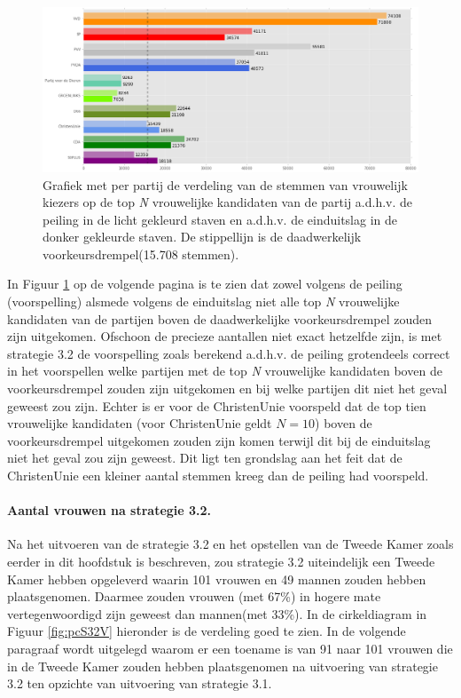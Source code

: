 \begin{figure}[h]

	\includegraphics[width=\linewidth]{stemmen_op_vrouwen_eigenX_samen.png}

			\caption{Grafiek met per partij de verdeling van de stemmen van vrouwelijk kiezers op de top \textit{N} vrouwelijke kandidaten van de partij a.d.h.v. de peiling \citep{IPSOS} in de licht gekleurd staven en a.d.h.v. de einduitslag \citep{Kiesraad_databank} in de donker gekleurde staven. De stippellijn is de daadwerkelijk voorkeursdrempel(15.708 stemmen).}

\label{fig:stemmenS32V}
\end{figure}


In Figuur \ref{fig:stemmenS32V} op de volgende pagina is te zien dat zowel volgens de peiling (voorspelling) alsmede volgens de einduitslag niet alle top \textit{N} vrouwelijke kandidaten van de partijen boven de daadwerkelijke voorkeursdrempel zouden zijn uitgekomen. Ofschoon de precieze aantallen niet exact hetzelfde zijn, is met strategie 3.2 de voorspelling zoals berekend a.d.h.v. de peiling grotendeels correct in het voorspellen welke partijen met de top \textit{N} vrouwelijke kandidaten boven de voorkeursdrempel zouden zijn uitgekomen en bij welke partijen dit niet het geval geweest zou zijn. Echter is er voor de ChristenUnie voorspeld dat de top tien vrouwelijke kandidaten (voor ChristenUnie geldt $N=10$) boven de voorkeursdrempel uitgekomen zouden zijn komen terwijl dit bij de einduitslag niet het geval zou zijn geweest. Dit ligt ten grondslag aan het feit dat de ChristenUnie een kleiner aantal stemmen kreeg dan de peiling had voorspeld. 

\paragraph{Aantal vrouwen na strategie 3.2.}
Na het uitvoeren van de strategie 3.2 en het opstellen van de Tweede Kamer zoals eerder in dit hoofdstuk is beschreven, zou strategie 3.2 uiteindelijk een Tweede Kamer hebben opgeleverd waarin 101 vrouwen en 49 mannen zouden hebben plaatsgenomen. Daarmee zouden vrouwen (met 67\%) in hogere mate vertegenwoordigd zijn geweest dan mannen(met 33\%). In de cirkeldiagram in Figuur \ref{fig:pcS32V} hieronder is de verdeling goed te zien. In de volgende paragraaf wordt uitgelegd waarom er een toename is van 91 naar 101 vrouwen die in de Tweede Kamer zouden hebben plaatsgenomen na uitvoering van strategie 3.2 ten opzichte van uitvoering van strategie 3.1.

